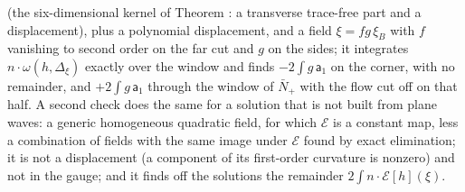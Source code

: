 (the six-dimensional kernel of Theorem : a transverse trace-free part and a displacement), plus a polynomial displacement, and a field $\xi = f g\,\xi_{B}$ with $f$ vanishing to second order on the far cut and $g$ on the sides; it integrates $n \cdot \omega(h, \Delta_{\xi})$ exactly over the window and finds $-2\int g\,\mathsf{a}_{1}$ on the corner, with no remainder, and $+2\int g\,\mathsf{a}_{1}$ through the window of $\bar N_{+}$ with the flow cut off on that half. A second check does the same for a solution that is not built from plane waves: a generic homogeneous quadratic field, for which $\mathcal{E}$ is a constant map, less a combination of fields with the same image under $\mathcal{E}$ found by exact elimination; it is not a displacement (a component of its first-order curvature is nonzero) and not in the gauge; and it finds off the solutions the remainder $2\int n \cdot \mathcal{E}[h](\xi)$.

